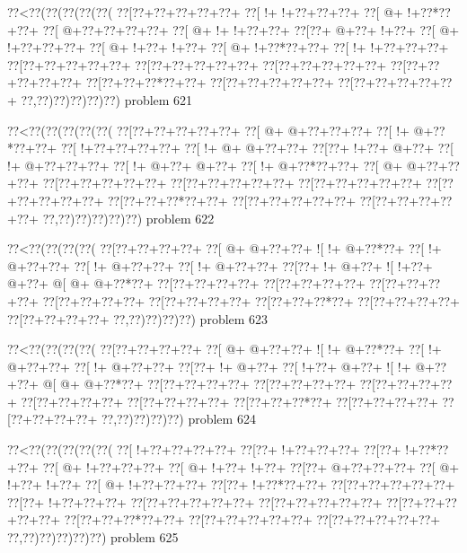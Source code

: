 \vbox{\vbox{\goo
\0??<\0??(\0??(\0??(\0??(\0??(
\0??[\0??+\0??+\0??+\0??+\0??+
\0??[\- !+\- !+\0??+\0??+\0??+
\0??[\- @+\- !+\0??*\0??+\0??+
\0??[\- @+\0??+\0??+\0??+\0??+
\0??[\- @+\- !+\- !+\0??+\0??+
\0??[\0??+\- @+\0??+\- !+\0??+
\0??[\- @+\- !+\0??+\0??+\0??+
\0??[\- @+\- !+\0??+\- !+\0??+
\0??[\- @+\- !+\0??*\0??+\0??+
\0??[\- !+\- !+\0??+\0??+\0??+
\0??[\0??+\0??+\0??+\0??+\0??+
\0??[\0??+\0??+\0??+\0??+\0??+
\0??[\0??+\0??+\0??+\0??+\0??+
\0??[\0??+\0??+\0??+\0??+\0??+
\0??[\0??+\0??+\0??*\0??+\0??+
\0??[\0??+\0??+\0??+\0??+\0??+
\0??[\0??+\0??+\0??+\0??+\0??+
\0??,\0??)\0??)\0??)\0??)\0??)
}
\hfil problem 621\hfil\break
}

\vbox{\vbox{\goo
\0??<\0??(\0??(\0??(\0??(\0??(
\0??[\0??+\0??+\0??+\0??+\0??+
\0??[\- @+\- @+\0??+\0??+\0??+
\0??[\- !+\- @+\0??*\0??+\0??+
\0??[\- !+\0??+\0??+\0??+\0??+
\0??[\- !+\- @+\- @+\0??+\0??+
\0??[\0??+\- !+\0??+\- @+\0??+
\0??[\- !+\- @+\0??+\0??+\0??+
\0??[\- !+\- @+\0??+\- @+\0??+
\0??[\- !+\- @+\0??*\0??+\0??+
\0??[\- @+\- @+\0??+\0??+\0??+
\0??[\0??+\0??+\0??+\0??+\0??+
\0??[\0??+\0??+\0??+\0??+\0??+
\0??[\0??+\0??+\0??+\0??+\0??+
\0??[\0??+\0??+\0??+\0??+\0??+
\0??[\0??+\0??+\0??*\0??+\0??+
\0??[\0??+\0??+\0??+\0??+\0??+
\0??[\0??+\0??+\0??+\0??+\0??+
\0??,\0??)\0??)\0??)\0??)\0??)
}
\hfil problem 622\hfil\break
}

\vbox{\vbox{\goo
\0??<\0??(\0??(\0??(\0??(
\0??[\0??+\0??+\0??+\0??+
\0??[\- @+\- @+\0??+\0??+
\- ![\- !+\- @+\0??*\0??+
\0??[\- !+\- @+\0??+\0??+
\0??[\- !+\- @+\0??+\0??+
\0??[\- !+\- @+\0??+\0??+
\0??[\0??+\- !+\- @+\0??+
\- ![\- !+\0??+\- @+\0??+
\- @[\- @+\- @+\0??*\0??+
\0??[\0??+\0??+\0??+\0??+
\0??[\0??+\0??+\0??+\0??+
\0??[\0??+\0??+\0??+\0??+
\0??[\0??+\0??+\0??+\0??+
\0??[\0??+\0??+\0??+\0??+
\0??[\0??+\0??+\0??*\0??+
\0??[\0??+\0??+\0??+\0??+
\0??[\0??+\0??+\0??+\0??+
\0??,\0??)\0??)\0??)\0??)
}
\hfil problem 623\hfil\break
}

\vbox{\vbox{\goo
\0??<\0??(\0??(\0??(\0??(
\0??[\0??+\0??+\0??+\0??+
\0??[\- @+\- @+\0??+\0??+
\- ![\- !+\- @+\0??*\0??+
\0??[\- !+\- @+\0??+\0??+
\0??[\- !+\- @+\0??+\0??+
\0??[\0??+\- !+\- @+\0??+
\0??[\- !+\0??+\- @+\0??+
\- ![\- !+\- @+\0??+\0??+
\- @[\- @+\- @+\0??*\0??+
\0??[\0??+\0??+\0??+\0??+
\0??[\0??+\0??+\0??+\0??+
\0??[\0??+\0??+\0??+\0??+
\0??[\0??+\0??+\0??+\0??+
\0??[\0??+\0??+\0??+\0??+
\0??[\0??+\0??+\0??*\0??+
\0??[\0??+\0??+\0??+\0??+
\0??[\0??+\0??+\0??+\0??+
\0??,\0??)\0??)\0??)\0??)
}
\hfil problem 624\hfil\break
}

\vbox{\vbox{\goo
\0??<\0??(\0??(\0??(\0??(\0??(
\0??[\- !+\0??+\0??+\0??+\0??+
\0??[\0??+\- !+\0??+\0??+\0??+
\0??[\0??+\- !+\0??*\0??+\0??+
\0??[\- @+\- !+\0??+\0??+\0??+
\0??[\- @+\- !+\0??+\- !+\0??+
\0??[\0??+\- @+\0??+\0??+\0??+
\0??[\- @+\- !+\0??+\- !+\0??+
\0??[\- @+\- !+\0??+\0??+\0??+
\0??[\0??+\- !+\0??*\0??+\0??+
\0??[\0??+\0??+\0??+\0??+\0??+
\0??[\0??+\- !+\0??+\0??+\0??+
\0??[\0??+\0??+\0??+\0??+\0??+
\0??[\0??+\0??+\0??+\0??+\0??+
\0??[\0??+\0??+\0??+\0??+\0??+
\0??[\0??+\0??+\0??*\0??+\0??+
\0??[\0??+\0??+\0??+\0??+\0??+
\0??[\0??+\0??+\0??+\0??+\0??+
\0??,\0??)\0??)\0??)\0??)\0??)
}
\hfil problem 625\hfil\break
}

